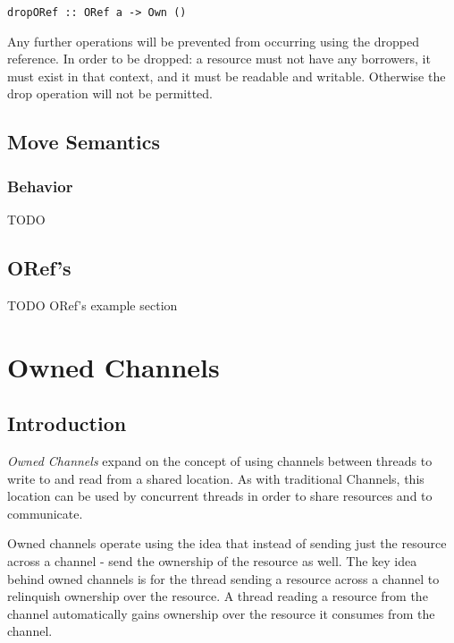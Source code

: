 \documentclass[onehalf,11pt]{beavtex}
\begin{document}
\begin{verbatim}
dropORef :: ORef a -> Own ()
\end{verbatim}

Any further operations will be prevented from occurring using the dropped
reference. In order to be dropped: a resource must not have any borrowers,
it must exist in that context,
and it must be readable and writable.
Otherwise the drop operation will not be permitted.

\section{Move Semantics}

\subsection{Behavior}

TODO


\section{ORef's}

TODO ORef's example section


\chapter{Owned Channels}

\section{Introduction}

\textit{Owned Channels} expand on the concept of using channels between threads
to write to and read from a shared location.   As with traditional Channels,
this location can be used by concurrent threads in order to share resources and
to communicate.


Owned channels operate using the idea that instead of sending just the
resource across a channel - send the ownership of the resource as well.
The key idea behind owned channels is for the thread sending a
resource across a channel to relinquish ownership over the resource.
A thread reading a resource from the channel automatically gains ownership over
the resource it consumes from the channel.
\end{document}
